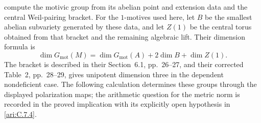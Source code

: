 \citet[Construction~3.4, p.~12, Lemma~3.5, p.~13, and
Proposition~4.12, pp.~19--20]{bertolin2022} compute the motivic
group from its abelian point and extension data and the central
Weil-pairing bracket. For the $1$-motives used here, let $B$ be the
smallest abelian subvariety generated by these data, and let $Z(1)$
be the central torus obtained from that bracket and the remaining
algebraic lift. Their dimension formula is
\begin{equation}\label{ari:eq:cp-MTdim}
 \dim G_{\mathrm{mot}}(M)
 =\dim G_{\mathrm{mot}}(A)+2\dim B+\dim Z(1).
\end{equation}
The bracket is described in their Section~6.1, pp.~26--27, and
their corrected Table~2, pp.~28--29, gives unipotent dimension
three in the dependent nondeficient case. The following calculation
determines these groups through the displayed polarization maps;
the arithmetic question for the metric norm is recorded in the
proved implication with its explicitly open hypothesis in \cref{ari:C.7.4}.

